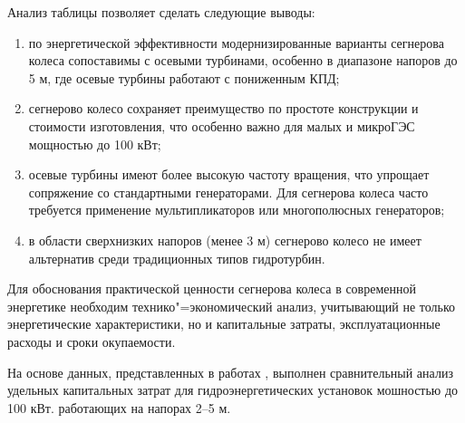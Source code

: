 Анализ таблицы  позволяет сделать следующие выводы:
\begin{enumerate}
    \renewcommand{\labelenumi}{\arabic{enumi})}
    \item по энергетической эффективности модернизированные варианты сегнерова колеса сопоставимы с осевыми турбинами, особенно в диапазоне напоров до 5 м, где осевые турбины работают с пониженным КПД;
    \item сегнерово колесо сохраняет преимущество по простоте конструкции и стоимости изготовления, что особенно важно для малых и микроГЭС мощностью до 100 кВт;
    \item осевые турбины имеют более высокую частоту вращения, что упрощает сопряжение со стандартными генераторами. Для сегнерова колеса часто требуется применение мультипликаторов или многополюсных генераторов;
    \item в области сверхнизких напоров (менее 3 м) сегнерово колесо не имеет альтернатив среди традиционных типов гидротурбин.
\end{enumerate}

Для обоснования практической ценности сегнерова колеса в современной энергетике
необходим технико"=экономический анализ, учитывающий не только энергетические
характеристики, но и капитальные затраты, эксплуатационные расходы и сроки окупаемости.
	
На основе данных, представленных в работах \cite{konchakov,suryanto}, выполнен сравнительный анализ
удельных капитальных затрат для гидроэнергетических установок мошностью до 100 кВт.
работающих на напорах 2--5 м.

